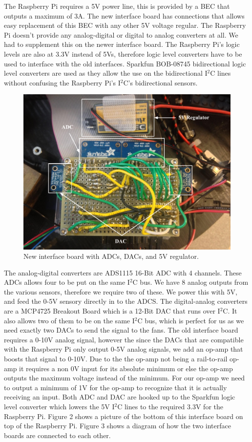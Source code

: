 \documentclass[conference, onecolumn, 12pt]{IEEEtran}
\begin{document}
The Raspberry Pi requires a 5V power line, this is provided by a BEC that outputs a maximum of 3A. The new interface board has connections that allows easy replacement of this BEC with any other 5V voltage regular. The Raspberry Pi doesn't provide any analog-digital or digital to analog converters at all. We had to supplement this on the newer interface board. The Raspberry Pi's logic levels are also at 3.3V instead of 5Vs, therefore logic level converters have to be used to interface with the old interfaces. Sparkfun BOB-08745 bidirectional logic level converters are used as they allow the use on the bidirectional I$^2$C lines without confusing the Raspberry Pi's I$^2$C's bidirectional sensors. 

\begin{figure}
\centering
\includegraphics[width=7in]{interface_board_labels.pdf}
\caption{New interface board with ADCs, DACs, and 5V regulator.}    
\end{figure}

The analog-digital converters are ADS1115 16-Bit ADC with 4 channels. These ADCs allows four to be put on the same I$^2$C bus. We have 8 analog outputs from the various sensors, therefore we require two of these. We power this with 5V, and feed the 0-5V sensory directly in to the ADCS. The digital-analog converters are a MCP4725 Breakout Board which is a 12-Bit DAC that runs over I$^2$C. It also allows two of them to be on the same I$^2$C bus, which is perfect for us as we need exactly two DACs to send the signal to the fans. The old interface board requires a 0-10V analog signal, however the since the DACs that are compatible with the Raspberry Pi only output 0-5V analog signals, we add an op-amp that boosts that signal to 0-10V. Due to the the op-amp not being a rail-to-rail op-amp it requires a non 0V input for its absolute minimum or else the op-amp outputs the maximum voltage instead of the minimum. For our op-amp we need to output a minimum of 1V for the op-amp to recognize that it is actually receiving an input. Both ADC and DAC are hooked up to the Sparkfun logic level converter which lowers the 5V I$^2$C lines to the required 3.3V for the Raspberry Pi. Figure 2 shows a picture of the bottom of this interface board on top of the Raspberry Pi. Figure 3 shows a diagram of how the two interface boards are connected to each other.
\end{document}
